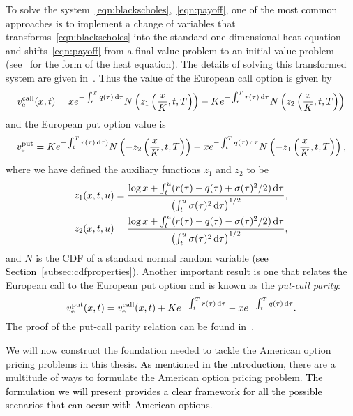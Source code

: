 To solve the system~\eqref{eqn:blackscholes},~\eqref{eqn:payoff}, \textcolor{black}{one of the most common approaches is} to implement a change of variables that transforms~\eqref{eqn:blackscholes} into the standard one-dimensional heat equation and shifts~\eqref{eqn:payoff} from a final value problem to an initial value problem (see~\cite{cannon1984one} for the form of the heat equation).
The details of solving this transformed system are given in~\cite{Wilmott1995}. Thus the value of the European call option is given by
	\begin{equation}
		\label{eqn:EUcall}
			v_{\text{e}}^{\text{call}}(x,t) = xe^{-\int_t^T q(\tau) \, \mathrm d\tau} N\left(z_1\left( \frac{x}{K}, t, T \right)\right) - K e^{-\int_t^T r(\tau) \, \mathrm d\tau} N\left(z_2\left( \frac{x}{K}, t, T \right)\right)
		\end{equation}
and the European put option value is
	\begin{equation}
		\label{eqn:EUput}
		v_{\text{e}}^{\text{put}} = K e^{-\int_t^T r(\tau) \, \mathrm d\tau) } N\left(-z_2\left( \frac{x}{K}, t, T \right)\right) - xe^{-\int_t^T q(\tau) \, \mathrm d\tau} N\left(-z_1\left( \frac{x}{K}, t, T \right)\right),
	\end{equation}
where we have defined the auxiliary functions $z_1$ and $z_2$ to be
	\begin{align}
		z_1(x,t,u) & = \frac{\log x + \int_t^u (r(\tau) - q(\tau) + \sigma(\tau)^2/2) \, \mathrm d\tau}{\left(\int_t^u \sigma(\tau)^2 \, \mathrm d\tau\right)^{1/2}}, \label{eqn:z1}\\
		z_2(x,t,u) & = \frac{\log x + \int_t^u (r(\tau) - q(\tau) - \sigma(\tau)^2/2) \, \mathrm d\tau}{\left(\int_t^u \sigma(\tau)^2 \, \mathrm d\tau\right)^{1/2}} \label{eqn:z2},
	\end{align}
and $N$ is the CDF of a standard normal random variable (\textcolor{black}{see Section~\ref{subsec:cdfproperties}}). Another important result is one that relates the European call to the European put option and is known as the \emph{put-call parity}:
	\begin{equation}
		\label{eqn:pcp}
		v_\text{e}^{\text{put}}(x,t) = v_\text{e}^{\text{call}}(x,t) + Ke^{-\int_t^T r(\tau) \, \mathrm d\tau} - xe^{-\int_t^T q(\tau) \, \mathrm d\tau}.
	\end{equation}
The proof of the put-call parity relation can be found in~\cite{Kwok2008}.

We will now construct the foundation needed to tackle the American option pricing problems in this thesis.
\textcolor{black}{As mentioned in the introduction}, there are a multitude of ways to formulate the American option pricing problem. \textcolor{black}{The formulation we will present provides a clear framework for all the possible scenarios that can occur with American options.}

